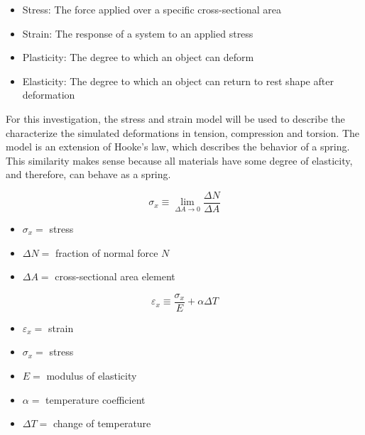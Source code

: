 \documentclass[12pt, letterpaper]{article}
\begin{document}
\begin{itemize}
\item Stress: The force applied over a specific cross-sectional area
\item Strain: The response of a system to an applied stress
\item Plasticity: The degree to which an object can deform
\item Elasticity: The degree to which an object can return to rest shape after deformation
\end{itemize}

For this investigation, the stress and strain model will be used to describe the characterize the simulated deformations in tension, compression and torsion. The model is an extension of Hooke's law, which describes the behavior of a spring. This similarity makes sense because all materials have some degree of elasticity, and therefore, can behave as a spring. 

\begin{singlespace}
\begin{equation}
	\label{eq:stress}
	\sigma_x \equiv \lim_{\Delta A \rightarrow 0} \frac{\Delta N}{\Delta A}
\end{equation}
\begin{small}
\begin{itemize}
\item[] $\sigma_x =$ stress
\item[] $\Delta N =$ fraction of normal force $N$
\item[] $\Delta A =$ cross-sectional area element
\end{itemize}
\end{small}
\end{singlespace}


\begin{singlespace}
\begin{equation}
	\label{eq:strain}
	\varepsilon_x \equiv \frac{\sigma_x}{E} + \alpha \Delta T
\end{equation}
\begin{small}
\begin{itemize}
\item[] $\varepsilon_x =$ strain
\item[] $\sigma_x =$ stress
\item[] $E =$ modulus of elasticity
\item[] $\alpha =$ temperature coefficient
\item[] $\Delta T =$ change of temperature
\end{itemize}
\end{small}
\end{singlespace}
\end{document}
